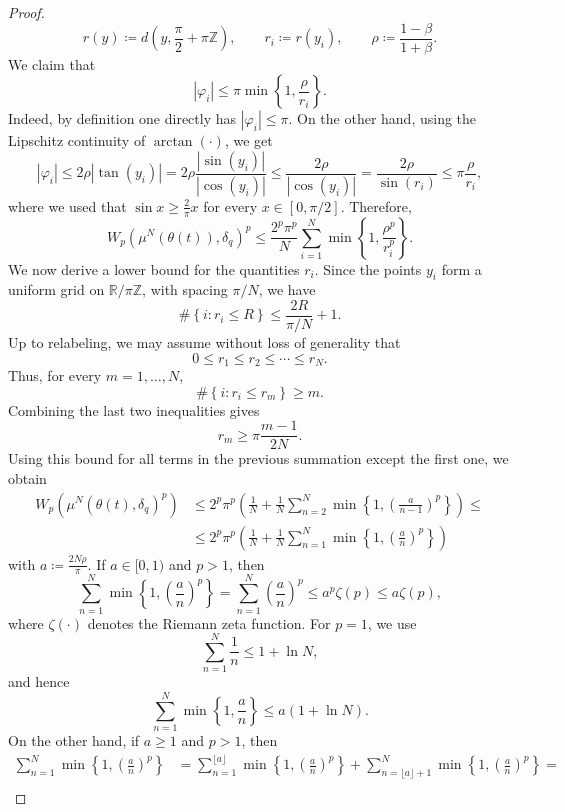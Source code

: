 \documentclass[10pt,a4paper]{amsart}
\newcommand{\R}{\mathbb{R}}
\newcommand{\Z}{\mathbb{Z}}
\begin{document}
\begin{proof}
       $$r(y)\coloneqq d\left(y,\frac{\pi}{2}+\pi\Z\right),\qquad r_i\coloneqq r(y_i),\qquad \rho\coloneqq\frac{1-\beta}{1+\beta}.$$
       We claim that
       $$|\varphi_i|\leq\pi\min\left\{1,\frac{\rho}{r_i}\right\}.$$
       Indeed, by definition one directly has $|\varphi_i|\leq\pi$. On the other hand, using the Lipschitz continuity of $\arctan(\cdot)$, we get
       $$ |\varphi_i| \leq 2\rho|\tan(y_i)| = 2\rho\frac{|\sin(y_i)|}{|\cos(y_i)|} \leq \frac{2\rho}{|\cos(y_i)|} = \frac{2\rho}{\sin(r_i)} \leq \pi\frac{\rho}{r_i}, $$
       where we used that $\sin x\geq\frac{2}{\pi}x$ for every $x\in[0,\pi/2]$. Therefore,
       $$W_p\left(\mu^N(\theta(t)),\delta_q\right)^p \leq \frac{2^p\pi^p}{N} \sum_{i=1}^N \min\left\{1,\frac{\rho^p}{r_i^p}\right\}.$$
       We now derive a lower bound for the quantities $r_i$. Since the points $y_i$ form a uniform grid on $\R/\pi\Z$, with spacing $\pi/N$, we have
       $$ \#\left\{i:r_i\leq R\right\} \leq \frac{2R}{\pi/N}+1. $$
       Up to relabeling, we may assume without loss of generality that
       $$0\leq r_1\leq r_2\leq\cdots\leq r_N.$$
       Thus, for every $m=1,\ldots,N$,
       $$ \#\left\{i:r_i\leq r_m\right\}\geq m. $$
       Combining the last two inequalities gives
       $$r_m\geq\pi\frac{m-1}{2N}.$$
       Using this bound for all terms in the previous summation except the first one, we obtain
       \begin{align*}
        W_p\left(\mu^N(\theta(t),\delta_{q})^p\right)&\leq2^p\pi^p\left(\frac{1}{N}+\frac{1}{N}\sum_{n=2}^N\min\left\{1,\left(\frac{a}{n-1}\right)^p\right\}\right)\leq\\
        &\leq2^p\pi^p\left(\frac{1}{N}+\frac{1}{N}\sum_{n=1}^N\min\left\{1,\left(\frac{a}{n}\right)^p\right\}\right)
       \end{align*}
       with $a\coloneqq\frac{2N\rho}{\pi}$. If $a\in[0,1)$ and $p>1$, then
       $$ \sum_{n=1}^N \min\left\{1,\left(\frac{a}{n}\right)^p\right\} = \sum_{n=1}^N\left(\frac{a}{n}\right)^p \leq a^p\zeta(p) \leq a\zeta(p), $$
       where $\zeta(\cdot)$ denotes the Riemann zeta function. For $p=1$, we use
       $$\sum_{n=1}^N\frac{1}{n}\leq1+\ln N,$$
       and hence
       $$ \sum_{n=1}^N \min\left\{1,\frac{a}{n}\right\} \leq a(1+\ln N). $$
       On the other hand, if $a\geq1$ and $p>1$, then 
       \begin{align*}
            \sum_{n=1}^N\min\left\{1,\left(\frac{a}{n}\right)^p\right\}&=\sum_{n=1}^{\lfloor a\rfloor}\min\left\{1,\left(\frac{a}{n}\right)^p\right\}+\sum_{n=\lfloor a\rfloor+1}^N\min\left\{1,\left(\frac{a}{n}\right)^p\right\}=\\

\end{align*}
\end{proof}
\end{document}
